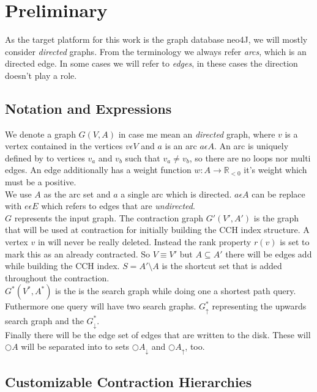 \chapter{Preliminary}

As the target platform for this work is the graph database neo4J, we will mostly consider \textit{directed} graphs. From the terminology we always refer \textit{arcs}, which is an directed edge.
In some cases we will refer to \textit{edges}, in these cases the direction doesn't play a role.

\section{Notation and Expressions}
We denote a graph $G(V, A)$ in case me mean an \textit{directed} graph, where $v$ is a vertex contained in the vertices $v \epsilon  V$ and $a$ is an
arc $a \epsilon A$. An arc is uniquely defined by to vertices $v_a$ and $v_b$ such that $v_a \neq v_b$, so there are no loops nor multi edges.
An edge additionally has a weight function $w: A \rightarrow \mathbb{R}_{<0} $ it's weight which must be a positive.
\\
We use $A$ as the arc set and $a$ a single arc which is directed. $a \epsilon A$ can be replace with $e \epsilon E$ which refers to edges that are \textit{undirected}. 
\\
$G$ represents the input graph. The contraction graph $G'(V', A')$ is the graph that will be used at contraction for initially building the CCH index structure. A vertex $v$ in will 
never be really deleted. Instead the rank property $r(v)$ is set to mark this as an already contracted. So $V \equiv V'$ but $A \subseteq A'$ there will be edges add while building
the CCH index. $S = A' \setminus A$ is the shortcut set that is added throughout the contraction. 
\\
$G^*(V^*, A^*)$ is the is the search graph while doing one a shortest path query. Futhermore one query will have two search graphs. $G^*_\uparrow$ representing the upwards search graph
and the $G^*_\downarrow$.
\\
Finally there will be the edge set of edges that are written to the disk. These will $\bigcirc A$ will be separated into to sets $\bigcirc A_\downarrow$ and $\bigcirc A_\uparrow $, too.


\section{Customizable Contraction Hierarchies}\label{sec:Preliminary_CCH}

